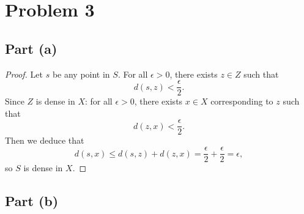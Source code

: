 \documentclass[11pt]{article}
\begin{document}
\newpage


\section{Problem 3}


\subsection{Part (a)}

\begin{proof}
  Let $s$ be any point in $S$. For all $\epsilon > 0$, there exists $z \in Z$ such that
  \[
    d(s, z) < \frac{\epsilon}{2}.
  \]
  Since $Z$ is dense in $X$: for all $\epsilon > 0$, there exists $x \in X$ corresponding to $z$ such that
  \[
    d(z, x) < \frac{\epsilon}{2}.
  \]
  Then we deduce that
  \[
    d(s, x) \le d(s, z) + d(z, x) = \frac{\epsilon}{2} + \frac{\epsilon}{2} = \epsilon,
  \]
  so $S$ is dense in $X$.
\end{proof}


\subsection{Part (b)}
\end{document}
